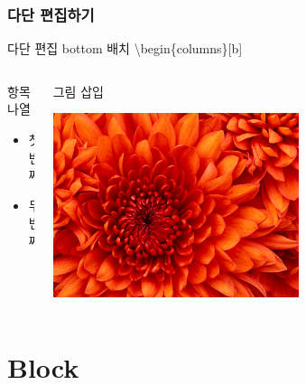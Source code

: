 \documentclass[10pt,blue,xcolor=pdftex,dvipsnames,table,handout]{beamer}
\begin{document}
		\begin{frame}[t]
		\frametitle{다단 편집하기}

			\begin{example} {다단 편집 bottom 배치}
			\textbackslash begin\{columns\}[b]
			\end{example}

		\begin{columns}[b]
		\begin{column}{.5\textwidth}

			\begin{block} {항목 나열}
			\begin{itemize}
			\item 첫 번째
			\item 두 번째
			\end{itemize}
			\end{block}

		\end{column}

		\begin{column}{.4\textwidth}

			\begin{block} {그림 삽입}
			\centerline{\includegraphics[scale=1.0,width=0.6\textwidth]{./fig/Chrysanthemum.jpg}}
			\end{block}

		\end{column}
		\end{columns}
		\end{frame}





		\section{Block}
\end{document}
